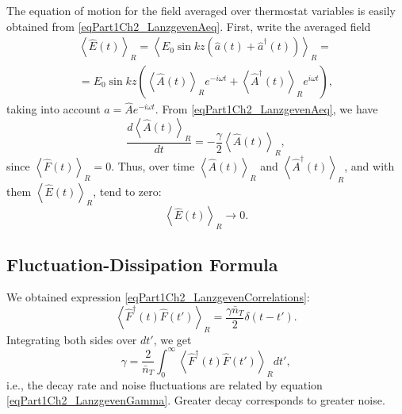The equation of motion for the field averaged over thermostat variables is easily obtained from \eqref{eqPart1Ch2_LanzgevenAeq}. First, write the averaged field
\begin{eqnarray}
\left<\hat{E}\left(t\right)\right>_R 
= \left< E_0 \sin kz \left( \hat{a}\left(t\right) +
\hat{a}^{\dag}\left(t\right)\right)\right>_R  = 
\nonumber \\
= E_0 \sin kz
\left(\left<\hat{A}\left(t\right)\right>_R e^{-i \omega t}
+
\left<\hat{A}^{\dag}\left(t\right)\right>_R e^{i \omega t}
\right),
\nonumber
\end{eqnarray}
taking into account $\hat{a} = \hat{A}e^{-i \omega t}$. From
\eqref{eqPart1Ch2_LanzgevenAeq}, we have
\begin{equation}
\frac{d \left<\hat{A}\left(t\right)\right>_R}{d t} = 
- \frac{\gamma}{2} \left<\hat{A}\left(t\right)\right>_R,
\nonumber
\end{equation}
since $\left<\hat{F}\left(t\right)\right>_R = 0$. Thus, over time
$\left<\hat{A}\left(t\right)\right>_R$ and
$\left<\hat{A}^{\dag}\left(t\right)\right>_R$, and with them  
$\left<\hat{E}\left(t\right)\right>_R$, tend to zero:
\begin{equation}
\left<\hat{E}\left(t\right)\right>_R \rightarrow 0.
\nonumber
\end{equation}

\subsection{Fluctuation-Dissipation Formula}
We obtained expression \eqref{eqPart1Ch2_LanzgevenCorrelations}:
\begin{equation}
\left<\hat{F}^{\dag}\left(t\right)\hat{F}\left(t'\right)\right>_R = 
\frac{\gamma \bar{n}_{T}}{2} \delta\left(t - t'\right).
\nonumber
\end{equation}
Integrating both sides over $d t'$, we get
\begin{equation}
\gamma =
\frac{2}{\bar{n}_T}\int_0^{\infty}\left<\hat{F}^{\dag}\left(t\right)\hat{F}\left(t'\right)\right>_R
d t',
\label{eqPart1Ch2_LanzgevenGamma}
\end{equation}
i.e., the decay rate and noise fluctuations are related by equation \eqref{eqPart1Ch2_LanzgevenGamma}. Greater decay corresponds to greater noise.

